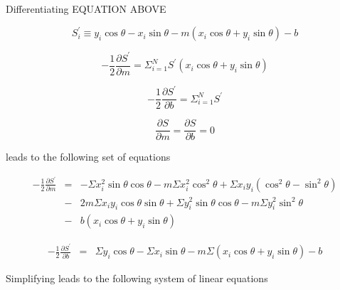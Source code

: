 \documentclass{article}
\begin{document}
Differentiating EQUATION ABOVE

\begin{equation}
S^{\prime}_{i} \equiv y_{i} \cos \theta - x_{i} \sin \theta - m \left( x_{i} \cos \theta + y_{i} \sin \theta \right) - b
\end{equation}

\begin{equation}
-\frac{1}{2}\frac{\partial S^{\prime}}{\partial m} = \Sigma_{i=1}^{N} S^{\prime} \left( x_{i} \cos \theta + y_{i} \sin \theta \right)
\end{equation}

\begin{equation}
-\frac{1}{2}\frac{\partial S^{\prime}}{\partial b} = \Sigma_{i=1}^{N} S^{\prime} 
\end{equation}

\begin{equation}
\frac{\partial S}{\partial m} = \frac{\partial S}{\partial b} = 0
\end{equation}

leads to the following set of equations

\begin{eqnarray}
-\frac{1}{2}\frac{\partial S^{\prime}}{\partial m} & = & - \Sigma x_{i}^{2} \sin \theta \cos \theta - m \Sigma x_{i}^{2} \cos^{2} \theta 
+ \Sigma x_{i} y_{i} \left( \cos^{2} \theta  - \sin^{2} \theta \right) \\
& - & 2m \Sigma x_{i} y_{i} \cos \theta \sin \theta + \Sigma y_{i}^{2} \sin \theta \cos \theta - m \Sigma y_{i}^{2} \sin^{2} \theta \\
& - & b \left( x_{i} \cos \theta + y_{i} \sin \theta \right)
\label{eqn:spm1}
\end{eqnarray}

\begin{eqnarray}
-\frac{1}{2}\frac{\partial S^{\prime}}{\partial b} & = &
\Sigma y_{i} \cos \theta - \Sigma x_{i} \sin \theta
- m \Sigma \left( x_{i} \cos \theta + y_{i} \sin \theta \right) - b
\label{eqn:spb1}
\end{eqnarray}

Simplifying leads to the following system of linear equations
\end{document}
